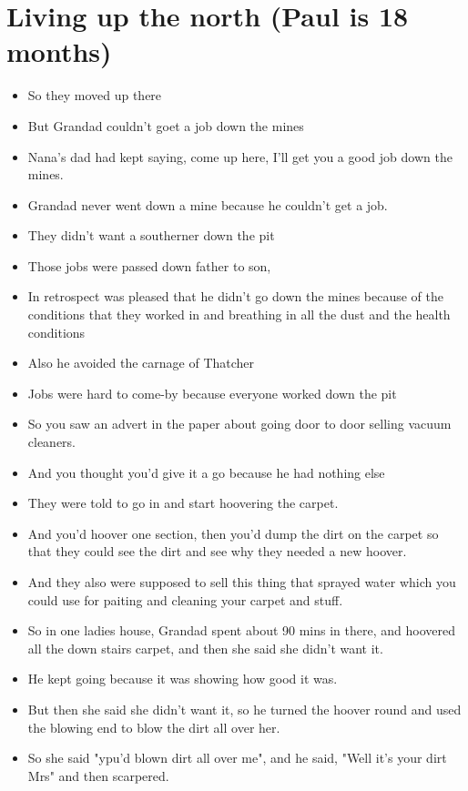 \documentclass[10pt,twocolumn,letterpaper]{article}
\begin{document}
\section{Living up the north (Paul is 18 months)}
\begin{itemize}
    \item So they moved up there
    \item But Grandad couldn't goet a job down the mines
    \item Nana's dad had kept saying, come up here, I'll get you a good job down the mines.
    \item Grandad never went down a mine because he couldn't get a job.
    \item They didn't want a southerner down the pit
    \item Those jobs were passed down father to son,
    \item In retrospect was pleased that he didn't go down the mines because of the conditions that they worked in and breathing in all the dust and the health conditions
    \item Also he avoided the carnage of Thatcher 
    \item Jobs were hard to come-by because everyone worked down the pit
    \item So you saw an advert in the paper about going door to door selling vacuum cleaners.
    \item And you thought you'd give it a go because he had nothing else
    \item They were told to go in and start hoovering the carpet.
    \item And you'd hoover one section, then you'd dump the dirt on the carpet so that they could see the dirt and see why they needed a new hoover.
    \item And they also were supposed to sell this thing that sprayed water which you could use for paiting and cleaning your carpet and stuff.
    \item So in one ladies house, Grandad spent about 90 mins in there, and hoovered all the down stairs carpet, and then she said she didn't want it.
    \item He kept going because it was showing how good it was.
    \item But then she said she didn't want it, so he turned the hoover round and used the blowing end to blow the dirt all over her.
    \item So she said "ypu'd blown dirt all over me", and he said, "Well it's your dirt Mrs" and then scarpered.

\end{itemize}
\end{document}
